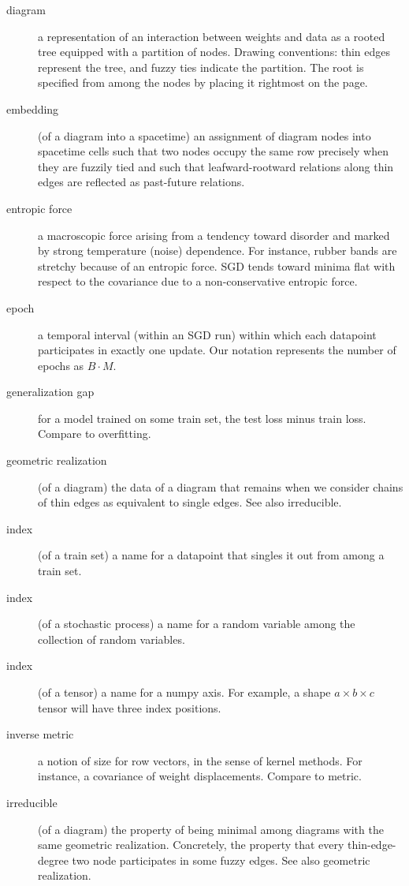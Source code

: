 \documentclass{article}
\theoremstyle{plain}
\theoremstyle{definition}
\begin{document}
\begin{description}
        \item[diagram] a representation of an interaction between weights and data as a rooted tree equipped with a partition of nodes.  Drawing conventions: thin edges represent the tree, and fuzzy ties indicate the partition.  The root is specified from among the nodes by placing it rightmost on the page.
        \item[embedding] (of a diagram into a spacetime) an assignment of diagram nodes into spacetime cells such that two nodes occupy the same row precisely when they are fuzzily tied and such that leafward-rootward relations along thin edges are reflected as past-future relations.
        \item[entropic force] a macroscopic force arising from a tendency toward disorder and marked by strong temperature (noise) dependence.  For instance, rubber bands are stretchy because of an entropic force.  SGD tends toward minima flat with respect to the covariance due to a non-conservative entropic force.    
        \item[epoch] a temporal interval (within an SGD run) within which each datapoint participates in exactly one update.  Our notation represents the number of epochs as $B\cdot M$.
        \item[generalization gap] for a model trained on some train set, the test loss minus train loss.  Compare to overfitting.
        \item[geometric realization] (of a diagram) the data of a diagram that remains when we consider chains of thin edges as equivalent to single edges.  See also irreducible.
        \item[index] (of a train set) a name for a datapoint that singles it out from among a train set.
        \item[index] (of a stochastic process) a name for a random variable among the collection of random variables.
        \item[index] (of a tensor) a name for a numpy axis.  For example, a shape $a\times b\times c$ tensor will have three index positions. 
        \item[inverse metric] a notion of size for row vectors, in the sense of kernel methods.  For instance, a covariance of weight displacements.  Compare to metric.
        \item[irreducible] (of a diagram) the property of being minimal among diagrams with the same geometric realization.  Concretely, the property that every thin-edge-degree two node participates in some fuzzy edges.  See also geometric realization. 

\end{description}
\end{document}
